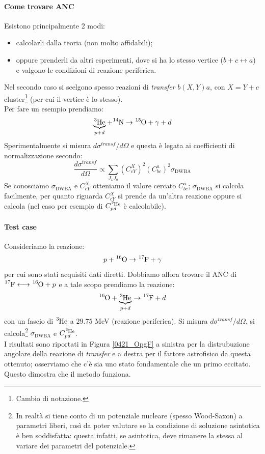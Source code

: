 \paragraph{Come trovare ANC} Esistono principalmente 2 modi:
\begin{itemize}
	\item calcolarli dalla teoria (non molto affidabili);
	\item oppure prenderli da altri esperimenti, dove si ha lo stesso vertice ($b+c \longleftrightarrow a$) e valgono le condizioni di reazione periferica.
\end{itemize}
\noindent Nel secondo caso si scelgono spesso reazioni di \textit{transfer} $b(X,Y)a$, con $X=Y+c$ cluster\footnote{Cambio di notazione.} (per cui il vertice è lo stesso).\\ 
Per fare un esempio prendiamo:
$$\underbrace{\ce{^{3}He}}_{p+d} + \ce{^{14}N} \to \ce{^{15}O}+\gamma + d$$
Sperimentalmente si misura $d\sigma^{transf}/d\Omega$ e questa è legata ai coefficienti di normalizzazione secondo:
$$\frac{d\sigma^{transf}}{d\Omega}\propto \sum_{J_x J_a} (C_{cY}^X)^2 (C_{bc}^a)^2 \sigma_\text{DWBA}$$
Se conosciamo $\sigma_\text{DWBA}$ e $C_{cY}^X$ otteniamo il valore cercato $C_{bc}^a$; $\sigma_\text{DWBA}$ si calcola facilmente, per quanto riguarda $C_{cY}^X$ si prende da un'altra reazione oppure si calcola (nel caso per esempio di $C_{pd}^{\ce{^3He}}$ è calcolabile).

\paragraph{Test case} Consideriamo la reazione:
$$p+\ce{^{16}O} \to \ce{^{17}F} + \gamma$$
per cui sono stati acquisiti dati diretti. Dobbiamo allora trovare il ANC di $\ce{^{17}F} \longleftrightarrow \ce{^{16}O} + p$ e a tale scopo prendiamo la reazione:
$$\ce{^{16}O} + \underbrace{\ce{^3He}}_{p+d} \to \ce{^{17}F} + d$$
con un fascio di $\ce{^3He}$ a $29.75$ MeV (reazione periferica). Si misura $d\sigma^{transf}/d\Omega$, si calcola\footnote{In realtà si tiene conto di un potenziale nucleare (spesso Wood-Saxon) a parametri liberi, così da poter valutare se la condizione di soluzione asintotica è ben soddisfatta: questa infatti, se asintotica, deve rimanere la stessa al variare dei parametri del potenziale.} $\sigma_\text{DWBA}$ e $C_{pd}^{\ce{^3He}}$.\\ 
I risultati sono riportati in Figura \ref{0421_OpgF} a sinistra per la distrubuzione angolare della reazione di \textit{transfer} e a destra per il fattore astrofisico da questa ottenuto; osserviamo che c'è sia uno stato fondamentale che un primo eccitato. Questo dimostra che il metodo funziona.


